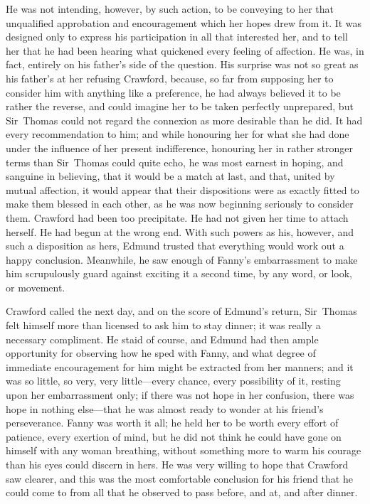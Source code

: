 He was not intending, however, by such action, to be conveying to her that unqualified approbation and encouragement which her hopes drew from it. It was designed only to express his participation in all that interested her, and to tell her that he had been hearing what quickened every feeling of affection. He was, in fact, entirely on his father's side of the question. His surprise was not so great as his father's at her refusing Crawford, because, so far from supposing her to consider him with anything like a preference, he had always believed it to be rather the reverse, and could imagine her to be taken perfectly unprepared, but Sir~Thomas could not regard the connexion as more desirable than he did. It had every recommendation to him; and while honouring her for what she had done under the influence of her present indifference, honouring her in rather stronger terms than Sir~Thomas could quite echo, he was most earnest in hoping, and sanguine in believing, that it would be a match at last, and that, united by mutual affection, it would appear that their dispositions were as exactly fitted to make them blessed in each other, as he was now beginning seriously to consider them. Crawford had been too precipitate. He had not given her time to attach herself. He had begun at the wrong end. With such powers as his, however, and such a disposition as hers, Edmund trusted that everything would work out a happy conclusion. Meanwhile, he saw enough of Fanny's embarrassment to make him scrupulously guard against exciting it a second time, by any word, or look, or movement.

Crawford called the next day, and on the score of Edmund's return, Sir~Thomas felt himself more than licensed to ask him to stay dinner; it was really a necessary compliment. He staid of course, and Edmund had then ample opportunity for observing how he sped with Fanny, and what degree of immediate encouragement for him might be extracted from her manners; and it was so little, so very, very little—every chance, every possibility of it, resting upon her embarrassment only; if there was not hope in her confusion, there was hope in nothing else—that he was almost ready to wonder at his friend's perseverance. Fanny was worth it all; he held her to be worth every effort of patience, every exertion of mind, but he did not think he could have gone on himself with any woman breathing, without something more to warm his courage than his eyes could discern in hers. He was very willing to hope that Crawford saw clearer, and this was the most comfortable conclusion for his friend that he could come to from all that he observed to pass before, and at, and after dinner.


